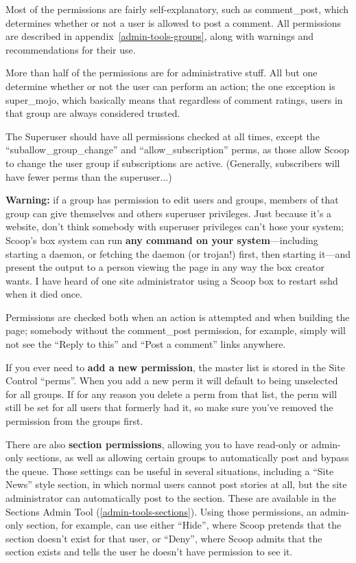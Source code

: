 Most of the permissions are fairly self-explanatory, such as comment\_post, which determines whether or not a user is allowed to post a comment.  All permissions are described in appendix~\ref{admin-tools-groups}, along with warnings and recommendations for their use.

More than half of the permissions are for administrative stuff.  All but one determine whether or not the user can perform an action; the one exception is super\_mojo, which basically means that regardless of comment ratings, users in that group are always considered trusted.

The Superuser should have all permissions checked at all times, except the ``suballow\_group\_change'' and ``allow\_subscription'' perms, as those allow Scoop to change the user group if subscriptions are active. (Generally, subscribers will have fewer perms than the superuser...)

{\bf Warning:} if a group has permission to edit users and groups, members of that group can give themselves and others superuser privileges.  Just because it's a website, don't think somebody with superuser privileges can't hose your system; Scoop's box system can run {\bf any command on your system}---including starting a daemon, or fetching the daemon (or trojan!) first, then starting it---and present the output to a person viewing the page in any way the box creator wants. I have heard of one site administrator using a Scoop box to restart sshd when it died once.

Permissions are checked both when an action is attempted and when building the page; somebody without the comment\_post permission, for example, simply will not see the ``Reply to this'' and ``Post a comment'' links anywhere.

If you ever need to {\bf add a new permission}, the master list is stored in the Site Control ``perms''.  When you add a new perm it will default to being unselected for all groups.  If for any reason you delete a perm from that list, the perm will still be set for all users that formerly had it, so make sure you've removed the permission from the groups first.

There are also {\bf section permissions}, allowing you to have read-only or admin-only sections, as well as allowing certain groups to automatically post and bypass the queue.  Those settings can be useful in several situations, including a ``Site News'' style section, in which normal users cannot post stories at all, but the site administrator can automatically post to the section.  These are available in the Sections Admin Tool (\ref{admin-tools-sections}).  Using those permissions, an admin-only section, for example, can use either ``Hide'', where Scoop pretends that the section doesn't exist for that user, or ``Deny'', where Scoop admits that the section exists and tells the user he doesn't have permission to see it.


